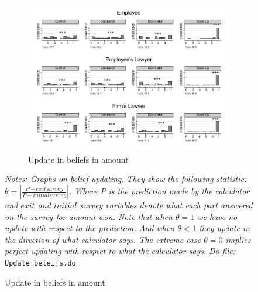 \documentclass[11pt]{article}
\begin{document}
\begin{figure}[H]
    \caption{Belief updating after treatment}
    \label{Figure_updating}
    \begin{center}
    \begin{subfigure}{\textwidth}
        \caption{Update in beliefs in amount}
        \centering
        \includegraphics[width=\textwidth]{updatebeleif_amount.pdf}
    \end{subfigure}
    \end{center}
     \footnotesize \textit{Notes: Graphs on belief updating. They show the following statistic: $\theta=\left|\frac{P-exitsurvey}{P-initialsurvey}\right|$. Where $P$ is the prediction made by the calculator and $exit$ and $initial$ survey variables denote what each part answered on the survey for amount won. Note that when $\theta=1$ we have no update with respect to the prediction. And when $\theta<1$ they update in the direction of what calculator says. The extreme case $\theta=0$ implies perfect updating with respect to what the calculator says.} 
      \footnotesize{ \textit{Do file: }  \texttt{Update\_beleifs.do}}
\end{figure}
\end{document}
